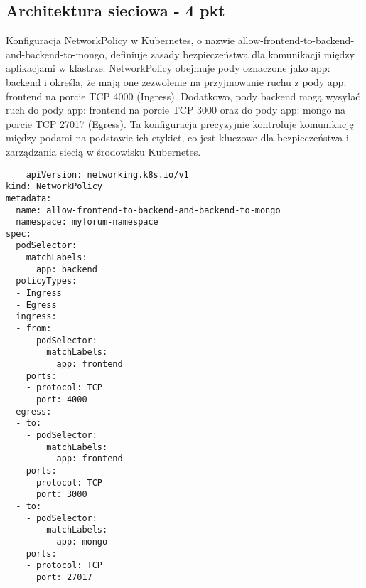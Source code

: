 \documentclass[12pt,a4paper]{article}
\begin{document}
\subsection{Architektura sieciowa - 4 pkt}
\label{sec:ExampleResults}

Konfiguracja NetworkPolicy w Kubernetes, o nazwie allow-frontend-to-backend-and-backend-to-mongo, definiuje zasady bezpieczeństwa dla komunikacji między aplikacjami w klastrze. NetworkPolicy obejmuje pody oznaczone jako app: backend i określa, że mają one zezwolenie na przyjmowanie ruchu z pody app: frontend na porcie TCP 4000 (Ingress). Dodatkowo, pody backend mogą wysyłać ruch do pody app: frontend na porcie TCP 3000 oraz do pody app: mongo na porcie TCP 27017 (Egress). Ta konfiguracja precyzyjnie kontroluje komunikację między podami na podstawie ich etykiet, co jest kluczowe dla bezpieczeństwa i zarządzania siecią w środowisku Kubernetes.

\begin{verbatim}
    apiVersion: networking.k8s.io/v1
kind: NetworkPolicy
metadata:
  name: allow-frontend-to-backend-and-backend-to-mongo
  namespace: myforum-namespace
spec:
  podSelector:
    matchLabels:
      app: backend
  policyTypes:
  - Ingress
  - Egress
  ingress:
  - from:
    - podSelector:
        matchLabels:
          app: frontend
    ports:
    - protocol: TCP
      port: 4000
  egress:
  - to:
    - podSelector:
        matchLabels:
          app: frontend
    ports:
    - protocol: TCP
      port: 3000
  - to:
    - podSelector:
        matchLabels:
          app: mongo
    ports:
    - protocol: TCP
      port: 27017

\end{verbatim}

\noindent




\nocite{*}
\end{document}
